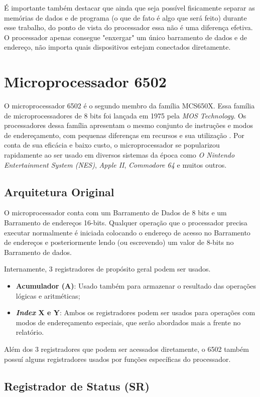 \documentclass[
	12pt,				  %
	openright,		%
	a4paper,			%
	english,			%
	french,				%
	spanish,			%
	brazil,				%
]{abntex2}
\begin{document}
É importante também destacar que ainda que seja possível fisicamente separar
as memórias de dados e de programa (o que de fato é algo que será feito) durante
esse trabalho, do ponto de vista do processador essa não é uma diferença efetiva.
O processador apenas consegue "enxergar" um único barramento de dados e de
endereço, não importa quais dispositivos estejam conectados diretamente.

\section{Microprocessador 6502} \label{sec:6502}
O microprocessador 6502 é o segundo membro da família MCS650X. Essa família de
microprocessadores de 8 bits foi lançada em 1975 pela \emph{MOS Technology}.
Os processadores dessa família apresentam o mesmo conjunto de instruções e modos
de endereçamento, com pequenas diferenças em recursos e sua utilização
\cite{mosHardware1976}. Por conta de sua eficácia e baixo custo, o
microprocessador se popularizou rapidamente ao ser usado em diversos sistemas
da época como \emph{O Nintendo Entertainment System (NES)}, \emph{Apple II},
\emph{Commodore 64} e muitos outros.
\subsection{Arquitetura Original}
O microprocessador conta com um Barramento de Dados de 8 bits e um Barramento de
endereços 16-bits. Qualquer operação que o processador precisa executar
normalmente é iniciada colocando o endereço de acesso no Barramento de endereços
e posteriormente lendo (ou escrevendo) um valor de 8-bits no Barramento de dados.

Internamente, 3 registradores de propósito geral podem ser usados.
\begin{itemize}
	\item \textbf{Acumulador (A)}: Usado também para armazenar o resultado das
	      operações lógicas e aritméticas;
	\item \textbf{\emph{Index} X e Y}: Ambos os registradores podem ser usados
	      para operações com modos de endereçamento especiais, que serão abordados
	      mais a frente no relatório.
\end{itemize}

Além dos 3 registradores que podem ser acessados diretamente, o 6502 também
possuí alguns registradores usados por funções específicas do processador.

\subsection{Registrador de Status (SR)} \label{statusReg}
\end{document}
